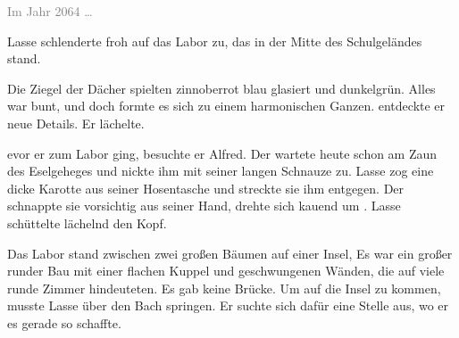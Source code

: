 \label{cha:2064_das_labor}

\textcolor{gray}{Im Jahr 2064 \dots}%

Lasse schlenderte froh auf das Labor zu, das in der Mitte des Schulgeländes stand. 

 Die Ziegel der Dächer spielten  zinnoberrot blau glasiert und dunkelgrün.  Alles war bunt, und doch formte es sich zu einem harmonischen Ganzen.
 entdeckte er  neue Details.
Er lächelte.

evor er zum Labor ging, besuchte er  Alfred.
Der wartete heute schon am Zaun des Eselgeheges und nickte ihm mit seiner langen Schnauze zu.
Lasse zog eine dicke Karotte aus seiner Hosentasche und streckte sie ihm entgegen.
Der schnappte sie vorsichtig aus seiner Hand,  drehte sich kauend  um .
Lasse schüttelte lächelnd den Kopf.

Das Labor stand zwischen zwei großen Bäumen auf einer Insel, 
Es war ein großer runder Bau mit einer flachen Kuppel und  geschwungenen Wänden, die auf viele runde Zimmer  hindeuteten.
Es gab keine Brücke.
Um auf die Insel zu kommen, musste Lasse über den Bach springen.
Er suchte sich dafür eine Stelle aus, wo er es gerade so schaffte.


